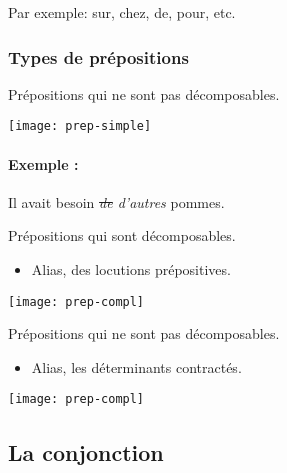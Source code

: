 \documentclass[10pt, french]{article}
\begin{document}
\begin{multicols*}{2}
\begin{definitionNOHFILL}[La préposition]
\tcbline

Par exemple:	sur, chez, de, pour, etc.
\end{definitionNOHFILL}

\subsubsection*{Types de prépositions}
\begin{definitionNOHFILLsub}
Prépositions qui ne sont pas décomposables.
\begin{center}
	\texttt{[image: prep-simple]}
\end{center}
\begin{astuces}
\paragraph{Exemple :}	Il avait besoin \textit{\sout{de} d'autres} pommes.
\end{astuces}
\end{definitionNOHFILLsub}

\begin{definitionNOHFILLsub}
Prépositions qui sont décomposables.
\begin{itemize}
	\item	Alias, des locutions prépositives.
\end{itemize}
\begin{center}
	\texttt{[image: prep-compl]}
\end{center}
\end{definitionNOHFILLsub}

\begin{definitionNOHFILLsub}
Prépositions qui ne sont pas décomposables.
\begin{itemize}
	\item	Alias, les déterminants contractés.
\end{itemize}
\begin{center}
	\texttt{[image: prep-compl]}
\end{center}

\end{definitionNOHFILLsub}


\columnbreak
\subsection{La conjonction}



\end{multicols*}
\end{document}
